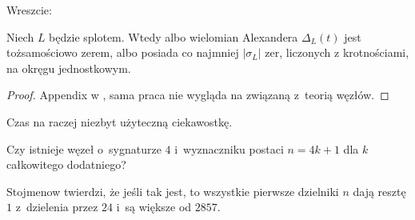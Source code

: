 Wreszcie:

\begin{proposition}
    Niech $L$ będzie splotem.
    Wtedy albo wielomian Alexandera $\Delta_L(t)$ jest tożsamościowo zerem, albo posiada co najmniej $|\sigma_L|$ zer, liczonych z krotnościami, na okręgu jednostkowym.
\end{proposition}

\begin{proof}
    Appendix w \cite{liechti16}, sama praca nie wygląda na związaną z~teorią węzłów.
\end{proof}

Czas na raczej niezbyt użyteczną ciekawostkę.

\begin{conjecture}
    Czy istnieje węzeł o~sygnaturze $4$ i~wyznaczniku postaci $n = 4k + 1$ dla $k$ całkowitego dodatniego?
\end{conjecture}

Stojmenow twierdzi, że jeśli tak jest, to wszystkie pierwsze dzielniki $n$ dają resztę $1$ z~dzielenia przez $24$ i~są większe od $2857$.

